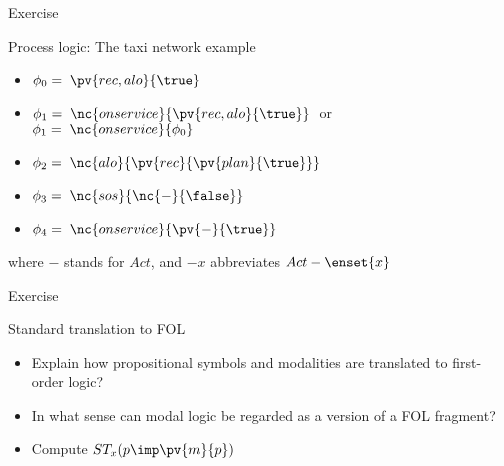 \documentclass{beamer}
\begin{document}
\begin{slide}{\red Exercise}\label{s:27}
\small
\begin{block}{Process logic: The taxi network example}
\begin{itemize}
\item $\phi_0 =\; \pv{rec,alo}{\true}$ 
\item $\phi_1 =\;  \nc{onservice}{\pv{rec,alo}{\true}}\; $ or\\
$\phi_1 =\;   \nc{onservice}{\phi_0}$
\item $\phi_2 =\;  \nc{alo}{\pv{rec}{\pv{plan}{\true}}}$
\item $\phi_3 =\;  \nc{sos}{\nc{-}{\false}}$
\item $\phi_4 =\;  \nc{onservice}{\pv{-}{\true}}$
\end{itemize}
where $-$ stands for $Act$, and $-x$ abbreviates $Act-\enset{x}$
\end{block}
\end{slide}


\begin{slide}{\red Exercise}\label{s:28}
\small
\begin{block}{Standard translation to FOL}
\begin{itemize}
\item Explain how propositional symbols and modalities are translated to first-order logic?
\item In what sense can modal logic be regarded as a  version of a FOL fragment?
\item Compute  $ST_x (p \imp \pv{m}{p})$ 
\end{itemize}
\end{block}
\end{slide}
\end{document}
